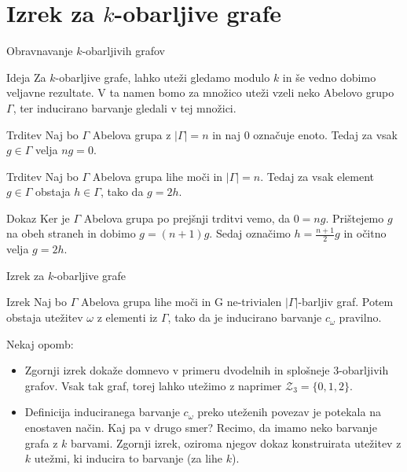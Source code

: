 \documentclass{beamer}
\begin{document}
\section{Izrek za $k$-obarljive grafe}
\begin{frame}{Obravnavanje $k$-obarljivih grafov}
	\begin{block}{Ideja}
		Za $k$-obarljive grafe, lahko uteži gledamo modulo $k$ in še vedno dobimo veljavne rezultate. V ta namen bomo za množico uteži vzeli neko Abelovo grupo $\Gamma$, ter inducirano barvanje gledali v tej množici.
	\end{block}

	\begin{block}{Trditev}
		Naj bo $\Gamma$ Abelova grupa z $|\Gamma| = n$ in naj $0$ označuje enoto. Tedaj za vsak $g \in \Gamma$ velja $ng = 0$.
	\end{block}
\end{frame}

\begin{frame}
	\begin{block}{Trditev}
		Naj bo $\Gamma$ Abelova grupa lihe moči in $|\Gamma| = n$. Tedaj za vsak element $g \in \Gamma$ obstaja $h \in \Gamma$, tako da $g = 2h$.
	\end{block}

	\begin{block}{Dokaz}
			Ker je $\Gamma$ Abelova grupa po prejšnji trditvi vemo, da $ 0 = ng$. Prištejemo $g$ na obeh straneh in dobimo $g = (n+1)g$. Sedaj označimo $h = \frac{n + 1}{2}g$ in očitno velja $g = 2h$.
	\end{block}
\end{frame}

\begin{frame}{Izrek za $k$-obarljive grafe}
	\begin{block}{Izrek}
	Naj bo $\Gamma$ Abelova grupa lihe moči in G ne-trivialen $|\Gamma|$-barljiv graf. Potem obstaja utežitev $\omega$ z elementi iz $\Gamma$, tako da je inducirano barvanje $c_{\omega}$ pravilno.
	\end{block}

	Nekaj opomb:
	\begin{itemize}
		\item Zgornji izrek dokaže domnevo v primeru dvodelnih in splošneje $3$-obarljivih grafov. Vsak tak graf, torej lahko utežimo z naprimer $\mathcal{Z}_3 = \{0,1,2\}$.
		\item Definicija induciranega barvanje $c_{\omega}$ preko uteženih povezav je potekala na enostaven način. Kaj pa v drugo smer? Recimo, da imamo neko barvanje grafa z $k$ barvami. Zgornji izrek, oziroma njegov dokaz konstruirata utežitev z $k$ utežmi, ki inducira to barvanje (za lihe $k$).
	\end{itemize}
\end{frame}
\end{document}
